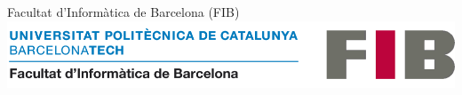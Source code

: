\documentclass[a4paper, titlepage, twoside, openright]{report}
\begin{document}
    \vspace{10mm}
    {\centering
    {\Large Facultat d'Informàtica de Barcelona (FIB)}\\
    \vspace{3mm}
    \includegraphics[scale=0.25]{images/portada/logo-fib.png}
    \par
}



\newpage
\renewcommand{\contentsname}{Índice}
\tableofcontents
\newpage



\newpage



\newpage

%





\newpage





\newpage



\appendixpage
\appendix



\newpage





\newpage



\newpage





\newpage



\newpage



\nocite{*}
\end{document}
